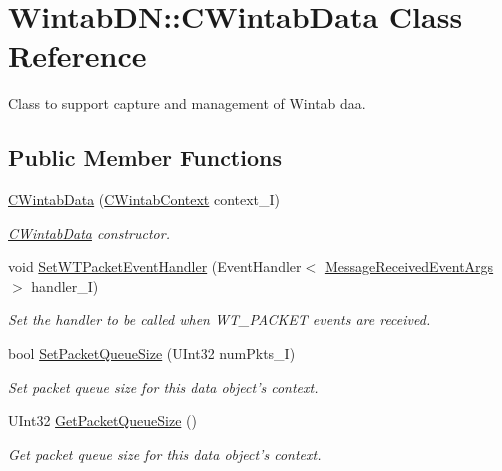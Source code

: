 \hypertarget{class_wintab_d_n_1_1_c_wintab_data}{
\section{WintabDN::CWintabData Class Reference}
\label{class_wintab_d_n_1_1_c_wintab_data}
}


Class to support capture and management of Wintab daa.  


\subsection*{Public Member Functions}
\begin{DoxyCompactItemize}
\item 
\hyperlink{class_wintab_d_n_1_1_c_wintab_data_a8abbb19213719fa2f5fe36c045d73a10}{CWintabData} (\hyperlink{class_wintab_d_n_1_1_c_wintab_context}{CWintabContext} context\_\-I)
\begin{DoxyCompactList}\small\item\em \hyperlink{class_wintab_d_n_1_1_c_wintab_data}{CWintabData} constructor. \item\end{DoxyCompactList}\item 
void \hyperlink{class_wintab_d_n_1_1_c_wintab_data_abcaeaac268ef61208c49f26bc4332072}{SetWTPacketEventHandler} (EventHandler$<$ \hyperlink{class_wintab_d_n_1_1_message_received_event_args}{MessageReceivedEventArgs} $>$ handler\_\-I)
\begin{DoxyCompactList}\small\item\em Set the handler to be called when WT\_\-PACKET events are received. \item\end{DoxyCompactList}\item 
bool \hyperlink{class_wintab_d_n_1_1_c_wintab_data_aeb55a22dfe88fd4c1635f960122e0b68}{SetPacketQueueSize} (UInt32 numPkts\_\-I)
\begin{DoxyCompactList}\small\item\em Set packet queue size for this data object's context. \item\end{DoxyCompactList}\item 
UInt32 \hyperlink{class_wintab_d_n_1_1_c_wintab_data_a05814e1b584694cd63724c2ac5797ba7}{GetPacketQueueSize} ()
\begin{DoxyCompactList}\small\item\em Get packet queue size for this data object's context. \item\end{DoxyCompactList}\item 

\end{DoxyCompactItemize}
